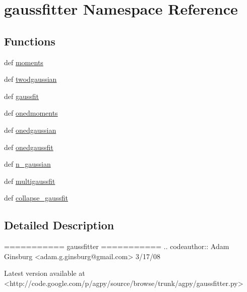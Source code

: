 \hypertarget{namespacegaussfitter}{\section{gaussfitter Namespace Reference}
\label{namespacegaussfitter}
}
\subsection*{Functions}
\begin{DoxyCompactItemize}
\item 
def \hyperlink{namespacegaussfitter_abd1c2194b2b4e46cf45ddfad70b03ceb}{moments}
\item 
def \hyperlink{namespacegaussfitter_a5ecea45513967b2a9673f8d484b1659c}{twodgaussian}
\item 
def \hyperlink{namespacegaussfitter_a216f1dc4453e3f52cbb62651be3d53c4}{gaussfit}
\item 
def \hyperlink{namespacegaussfitter_a0105f3835732be908715a64b0d103175}{onedmoments}
\item 
def \hyperlink{namespacegaussfitter_ae1b5c20c3b0c0dd91a2546de6234f4f3}{onedgaussian}
\item 
def \hyperlink{namespacegaussfitter_a1f9aea874228a76d5cb959c0a6cb777f}{onedgaussfit}
\item 
def \hyperlink{namespacegaussfitter_a7ccbf085e35174083d4761487269b4cb}{n\-\_\-gaussian}
\item 
def \hyperlink{namespacegaussfitter_a016a73df3118713791355e1368b0a932}{multigaussfit}
\item 
def \hyperlink{namespacegaussfitter_a90a54f5036afe56b9a3b0d0de0eb52fb}{collapse\-\_\-gaussfit}
\end{DoxyCompactItemize}


\subsection{Detailed Description}
\begin{DoxyVerb}===========
gaussfitter
===========
.. codeauthor:: Adam Ginsburg <adam.g.ginsburg@gmail.com> 3/17/08

Latest version available at <http://code.google.com/p/agpy/source/browse/trunk/agpy/gaussfitter.py>\end{DoxyVerb}
 

